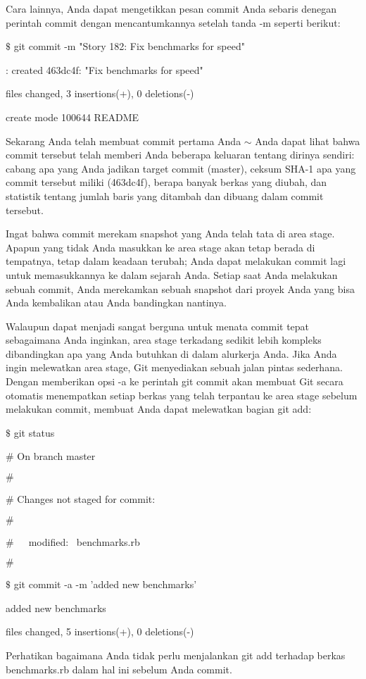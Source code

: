 \noindent 
Cara lainnya, Anda dapat mengetikkan pesan commit Anda sebaris denegan perintah $  $commit $  $dengan mencantumkannya setelah tanda -m seperti berikut: \par
\noindent 
 $  \$  $ git commit -m "Story 182: Fix benchmarks for speed" \par
\noindent 
[master]: created 463dc4f: "Fix benchmarks for speed" \par
{} files changed, 3 insertions(+), 0 deletions(-) \par
\noindent 
create mode 100644 README \par
\noindent 
Sekarang Anda telah membuat commit pertama Anda $  \sim  $ Anda dapat lihat bahwa commit tersebut telah memberi Anda beberapa keluaran tentang dirinya sendiri: cabang apa yang Anda jadikan target commit (master), ceksum SHA-1 apa yang commit tersebut miliki (463dc4f), berapa banyak berkas yang diubah, dan statistik tentang jumlah baris yang ditambah dan dibuang dalam commit tersebut. \par
\noindent 
Ingat bahwa commit merekam snapshot yang Anda telah tata di area stage. Apapun yang tidak Anda masukkan ke area stage akan tetap berada di tempatnya, tetap dalam keadaan terubah; Anda dapat melakukan commit lagi untuk memasukkannya ke dalam sejarah Anda. Setiap saat Anda melakukan sebuah commit, Anda merekamkan sebuah snapshot dari proyek Anda yang bisa Anda kembalikan atau Anda bandingkan nantinya. \par

 \par
\noindent 
Walaupun dapat menjadi sangat berguna untuk menata commit tepat sebagaimana Anda inginkan, area stage terkadang sedikit lebih kompleks dibandingkan apa yang Anda butuhkan di dalam alurkerja Anda. Jika Anda ingin melewatkan area stage, Git menyediakan sebuah jalan pintas sederhana. Dengan memberikan opsi $  $-a $  $ke perintah $  $git commit $  $akan membuat Git secara otomatis menempatkan setiap berkas yang telah terpantau ke area stage sebelum melakukan commit, membuat Anda dapat melewatkan bagian $  $git add: \par
\noindent 
 $  \$  $ git status \par
\noindent 
 $  \#  $ On branch master \par
\noindent 
 $  \#  $ \par
\noindent 
 $  \#  $ Changes not staged for commit: \par
\noindent 
 $  \#  $ \par
\noindent 
 $  \#  $~~~modified:~  benchmarks.rb \par
\noindent 
 $  \#  $ \par
\noindent 
 $  \$  $ git commit -a -m 'added new benchmarks' \par
\noindent 
[master 83e38c7] added new benchmarks \par
{} files changed, 5 insertions(+), 0 deletions(-) \par
\noindent 
Perhatikan bagaimana Anda tidak perlu menjalankan $  $git add $  $terhadap berkas benchmarks.rb dalam hal ini sebelum Anda commit. \par

